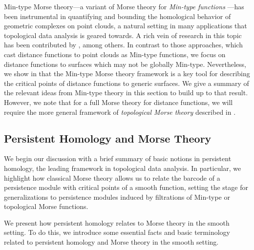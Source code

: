 \documentclass[11pt]{article}
\theoremstyle{plain}
\theoremstyle{definition}
\theoremstyle{remark}
\begin{document}
	Min-type Morse theory---a variant of Morse theory for \emph{Min-type functions} \citep{gershkovich_morse_1997}---has been instrumental in quantifying and bounding the homological behavior of geometric complexes on point clouds, a natural setting in many applications that topological data analysis is geared towards. A rich vein of research in this topic has been contributed by \cite{bobrowski_distance_2014,bobrowski2017vanishing,bobrowski2019random,de2022random}, among others. In contrast to those approaches, which cast distance functions to point clouds as Min-type functions, we focus on distance functions to surfaces which may not be globally Min-type. Nevertheless, we show in  that the Min-type Morse theory framework is a key tool for describing the critical points of distance functions to generic surfaces. We give a summary of the relevant ideas from Min-type theory in this section to build up to that result. However, we note that for a full Morse theory for distance functions, we will require the more general framework of \emph{topological Morse theory} described in .
	
	
	\subsection{Persistent Homology and Morse Theory}
	\label{sec:PH_and_Morse_theory}
	
	We begin our discussion with a brief summary of basic notions in persistent homology, the leading framework in topological data analysis. In particular, we highlight how classical Morse theory allows us to relate the barcode of a persistence module with critical points of a smooth function, setting the stage for generalizations to persistence modules induced by filtrations of Min-type or topological Morse functions. 
	
	We present how persistent homology relates to Morse theory in the  smooth setting. To do this, we introduce some essential facts and basic terminology related to persistent homology and Morse theory in the smooth setting.
	
\end{document}
